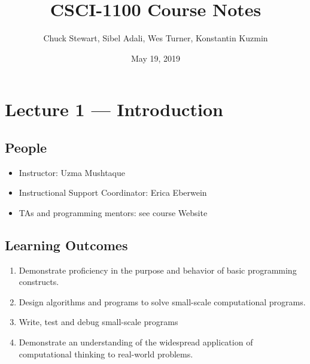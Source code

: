 \documentclass[letterpaper,10pt,english]{sphinxmanual}
\title{CSCI-1100 Course Notes}
\date{May 19, 2019}
\author{Chuck Stewart, Sibel Adali, Wes Turner, Konstantin Kuzmin}
\begin{document}
\pagestyle{empty}
\sphinxmaketitle
\pagestyle{plain}
\sphinxtableofcontents
\pagestyle{normal}
\label{\detokenize{lecture_notes::doc}}



\chapter{Lecture 1 — Introduction}
\label{\detokenize{lecture_notes/lec01_intro:lecture-1-introduction}}\label{\detokenize{lecture_notes/lec01_intro::doc}}

\section{People}
\label{\detokenize{lecture_notes/lec01_intro:people}}\begin{itemize}
\item {} 
Instructor: Uzma Mushtaque

\item {} 
Instructional Support Coordinator: Erica Eberwein

\item {} 
TAs and programming mentors:  see course Website

\end{itemize}


\section{Learning Outcomes}
\label{\detokenize{lecture_notes/lec01_intro:learning-outcomes}}\begin{enumerate}
\def\theenumi{\arabic{enumi}}
\def\labelenumi{\theenumi .}
\makeatletter\def\p@enumii{\p@enumi \theenumi .}\makeatother
\item {} 
Demonstrate proficiency in the purpose and behavior of basic
programming constructs.

\item {} 
Design algorithms and programs to solve small-scale computational
programs.

\item {} 
Write, test and debug small-scale programs

\item {} 
Demonstrate an understanding of the widespread application of
computational thinking to real-world problems.

\end{enumerate}
\end{document}

